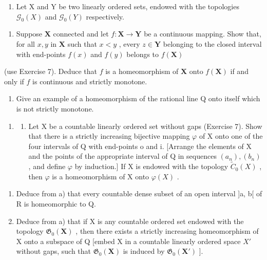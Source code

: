 \begin{enumerate}
\def\labelenumi{\arabic{enumi})}
\setcounter{enumi}{7}
\tightlist
\item
  Let X and Y be two linearly ordered sets, endowed with the topologies \(\mathcal{G}_{0}(X)\) and \(\mathcal{G}_{0}(Y)\) respectively.
\end{enumerate}

\begin{enumerate}
\def\labelenumi{\alph{enumi})}
\tightlist
\item
  Suppose \(\mathbf{X}\) connected and let \(f: \mathbf{X} \to \mathbf{Y}\) be a continuous mapping. Show that, for all \(x, y\) in \(\mathbf{X}\) such that \(x < y\) , every \(z \in \mathbf{Y}\) belonging to the closed interval with end-points \(f(x)\) and \(f(y)\) belongs to \(f(\mathbf{X})\)
\end{enumerate}

(use Exercise 7). Deduce that \(f\) is a homeomorphism of \(\mathbf{X}\) onto \(f(\mathbf{X})\) if and only if \(f\) is continuous and strictly monotone.

\begin{enumerate}
\def\labelenumi{\alph{enumi})}
\setcounter{enumi}{1}
\tightlist
\item
  Give an example of a homeomorphism of the rational line Q onto itself which is not strictly monotone.
\end{enumerate}

\begin{enumerate}
\def\labelenumi{\arabic{enumi})}
\setcounter{enumi}{8}
\tightlist
\item
  \begin{enumerate}
  \def\labelenumii{\alph{enumii})}
  \tightlist
  \item
    Let X be a countable linearly ordered set without gaps (Exercise 7). Show that there is a strictly increasing bijective mapping \(\varphi\) of X onto one of the four intervals of Q with end-points o and i. {[}Arrange the elements of X and the points of the appropriate interval of Q in sequences \((a_n), (b_n)\) , and define \(\varphi\) by induction.{]} If X is endowed with the topology \(\tilde{C}_0(X)\) , then \(\varphi\) is a homeomorphism of X onto \(\varphi(X)\) .
  \end{enumerate}
\end{enumerate}

\begin{enumerate}
\def\labelenumi{\alph{enumi})}
\setcounter{enumi}{1}
\item
  Deduce from a) that every countable dense subset of an open interval {]}a, b{[} of R is homeomorphic to Q.
\item
  Deduce from a) that if X is any countable ordered set endowed with the topology \(\mathfrak{G}_{0}(\mathbf{X})\) , then there exists a strictly increasing homeomorphism of X onto a subspace of Q {[}embed X in a countable linearly ordered space \(X'\) without gaps, such that \(\mathfrak{G}_{0}(\mathbf{X})\) is induced by \(\mathfrak{G}_{0}(\mathbf{X}')\) {]}.
\end{enumerate}

